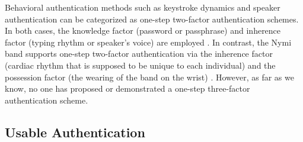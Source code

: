 \documentclass{sigchi}
\begin{document}


Behavioral authentication methods such as keystroke dynamics and speaker authentication can be categorized as one-step two-factor authentication schemes. In both cases, the knowledge factor (password or passphrase) and inherence factor (typing rhythm or speaker's voice) are employed \cite{Monrose1997}. In contrast, the Nymi band supports one-step two-factor authentication via the inherence factor (cardiac rhythm that is supposed to be unique to each individual) and the possession factor (the wearing of the band on the wrist) \cite{Nymi}. However, as far as we know, no one has proposed or demonstrated a one-step three-factor authentication scheme.%

\subsection{Usable Authentication}
\end{document}
